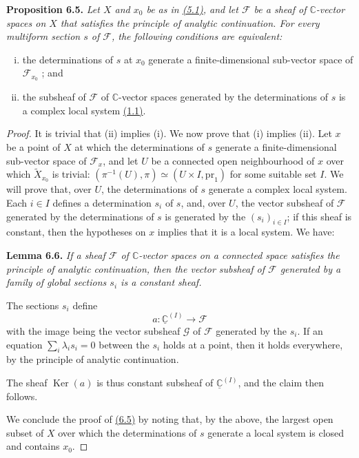 \documentclass{report}
\newenvironment{itenv}[1]
  {\phantomsection\par\medskip\noindent\textbf{#1.}\itshape}
  {\medskip}
\newcommand{\scr}[1]{{\mathscr{#1}}}
\newcommand{\CC}{\mathbb{C}}
\newcommand{\pr}{\mathrm{pr}}
\DeclareMathOperator{\Ker}{Ker}
\newcommand{\oldpage}[1]{\marginpar{\footnotesize$\Big\vert$ \textit{p.~#1}}}
\begin{document}
\begin{itenv}{Proposition 6.5}
\label{I.6.5}
  Let $X$ and $x_0$ be as in \hyperref[I.5.1]{(5.1)}, and let $\scr{F}$ be a sheaf of $\CC$-vector spaces on $X$ that satisfies the principle of analytic continuation.
  For every multiform section $s$ of $\scr{F}$, the following conditions are equivalent:
  \begin{enumerate}[(i)]
    \item the determinations of $s$ at $x_0$ generate a finite-dimensional sub-vector space of $\scr{F}_{x_0}$ ; and
    \item the subsheaf of $\scr{F}$ of $\CC$-vector spaces generated by the determinations of $s$ is a complex local system \hyperref[I.1.1]{(1.1)}.
  \end{enumerate}
\end{itenv}

\oldpage{38}
\begin{proof}
  It is trivial that (ii) implies (i).
  We now prove that (i) implies (ii).
  Let $x$ be a point of $X$ at which the determinations of $s$ generate a finite-dimensional sub-vector space of $\scr{F}_x$, and let $U$ be a connected open neighbourhood of $x$ over which $\widetilde{X}_{x_0}$ is trivial: $(\pi^{-1}(U),\pi) \simeq (U\times I,\pr_1)$ for some suitable set $I$.
  We will prove that, over $U$, the determinations of $s$ generate a complex local system.
  Each $i\in I$ defines a determination $s_i$ of $s$, and, over $U$, the vector subsheaf of $\scr{F}$ generated by the determinations of $s$ is generated by the $(s_i)_{i\in I}$;
  if this sheaf is constant, then the hypotheses on $x$ implies that it is a local system.
  We have:

  \begin{itenv}{Lemma 6.6}
  \label{I.6.6}
    If a sheaf $\scr{F}$ of $\CC$-vector spaces on a connected space satisfies the principle of analytic continuation, then the vector subsheaf of $\scr{F}$ generated by a family of global sections $s_i$ is a constant sheaf.
  \end{itenv}

  The sections $s_i$ define
  \[
    a\colon\underline{\CC}^{(I)}\to\scr{F}
  \]
  with the image being the vector subsheaf $\scr{G}$ of $\scr{F}$ generated by the $s_i$.
  If an equation $\sum_i\lambda_i s_i=0$ between the $s_i$ holds at a point, then it holds everywhere, by the principle of analytic continuation.

  The sheaf $\Ker(a)$ is thus constant subsheaf of $\underline{\CC}^{(I)}$, and the claim then follows.

  We conclude the proof of \hyperref[I.6.5]{(6.5)} by noting that, by the above, the largest open subset of $X$ over which the determinations of $s$ generate a local system is closed and contains $x_0$.
\end{proof}
\end{document}
